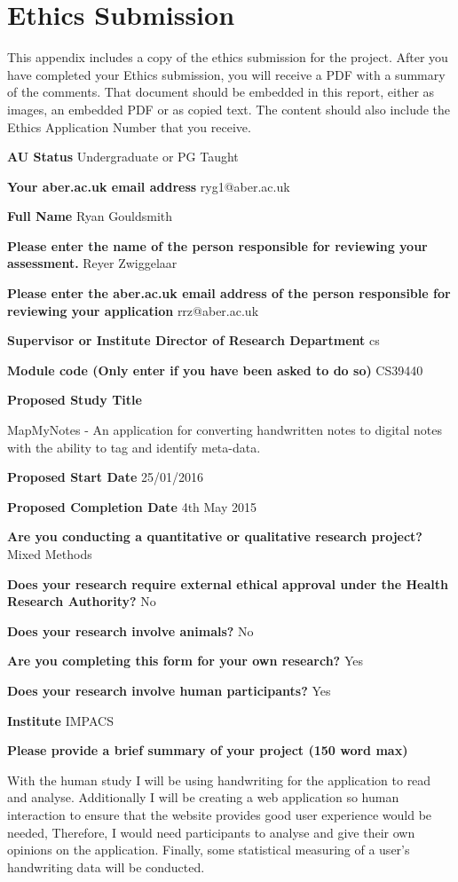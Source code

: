 \chapter{Ethics Submission}

This appendix includes a copy of the ethics submission for the project. After you have completed your Ethics submission, you will receive a PDF with a summary of the comments. That document should be embedded in this report, either as images, an embedded PDF or as copied text. The content should also include the Ethics Application Number that you receive.

\textbf{AU Status}
Undergraduate or PG Taught

\textbf{Your aber.ac.uk email address}
ryg1@aber.ac.uk

\textbf{Full Name}
Ryan Gouldsmith

\textbf{Please enter the name of the person responsible for reviewing your assessment.}
Reyer Zwiggelaar

\textbf{Please enter the aber.ac.uk email address of the person responsible for reviewing your application}
rrz@aber.ac.uk

\textbf{Supervisor or Institute Director of Research Department}
cs

\textbf{Module code (Only enter if you have been asked to do so)}
CS39440

\textbf{Proposed Study Title}

MapMyNotes - An application for converting handwritten notes to digital notes with the ability to tag and identify meta-data.

\textbf{Proposed Start Date}
25/01/2016

\textbf{Proposed Completion Date}
4th May 2015

\textbf{Are you conducting a quantitative or qualitative research project?}
Mixed Methods

\textbf{Does your research require external ethical approval under the Health Research Authority?}
No

\textbf{Does your research involve animals?}
No

\textbf{Are you completing this form for your own research?}
Yes

\textbf{Does your research involve human participants?}
Yes

\textbf{Institute}
IMPACS

\textbf{Please provide a brief summary of your project (150 word max)}

With the human study I will be using handwriting for the application to read and analyse. Additionally I will be creating a web application so human interaction to ensure that the website provides good user experience would be needed, Therefore, I would need participants to analyse and give their own opinions on the application. Finally, some statistical measuring of a user's handwriting data will be conducted.

